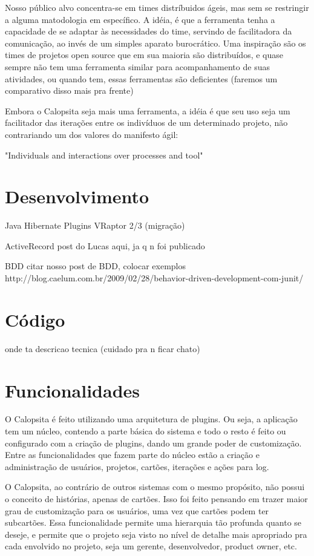 \documentclass[titlepage,a4paper]{article}
\begin{document}
Nosso público alvo concentra-se em times distríbuidos ágeis, mas sem se restringir a alguma matodologia em específico. A idéia, é que a ferramenta tenha a capacidade de se adaptar às necessidades do time, servindo de facilitadora da comunicação, ao invés de um simples aparato burocrático. Uma inspiração são os times de projetos open source que em sua maioria são distribuídos, e quase sempre não tem uma ferramenta similar para acompanhamento de suas atividades, ou quando tem, essas ferramentas são deficientes (faremos um comparativo disso mais pra frente)

Embora o Calopsita seja mais uma ferramenta, a idéia é que seu uso seja um facilitador das iterações entre os indivíduos de um determinado projeto, não contrariando um dos valores do manifesto ágil:

"Individuals and interactions over processes and tool"

\section{Desenvolvimento}
Java
Hibernate
Plugins
VRaptor 2/3 (migração)

ActiveRecord
post do Lucas aqui, ja q n foi publicado

BDD
citar nosso post de BDD, colocar exemplos
http://blog.caelum.com.br/2009/02/28/behavior-driven-development-com-junit/

\section{Código}

onde ta
descricao tecnica (cuidado pra n ficar chato)

\section{Funcionalidades}

O Calopsita é feito utilizando uma arquitetura de plugins. Ou seja, a aplicação tem um núcleo, contendo a parte básica do sistema e todo o resto é feito ou configurado com a criação de plugins, dando um grande poder de customização.
Entre as funcionalidades que fazem parte do núcleo estão a criação e administração de usuários,
projetos, cartões, iterações e ações para log.

O Calopsita, ao contrário de outros sistemas com o mesmo propósito, não possui o conceito de histórias, apenas de cartões. Isso foi feito pensando em trazer maior grau de customização para os usuários, uma vez que cartões podem ter subcartões. Essa funcionalidade permite uma hierarquia tão profunda quanto se deseje, e permite que o projeto seja visto no nível de detalhe mais apropriado pra cada envolvido no projeto, seja um gerente, desenvolvedor, product owner, etc.
\end{document}
